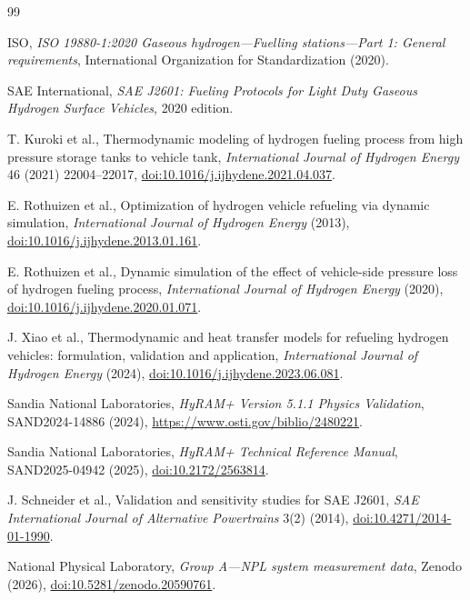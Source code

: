 \documentclass[12pt,a4paper]{article}
\begin{document}
\begin{thebibliography}{99}

ISO, \textit{ISO 19880-1:2020 Gaseous hydrogen---Fuelling stations---Part 1:
General requirements}, International Organization for Standardization (2020).

SAE International, \textit{SAE J2601: Fueling Protocols for Light Duty Gaseous
Hydrogen Surface Vehicles}, 2020 edition.

T. Kuroki et al., Thermodynamic modeling of hydrogen fueling process from high
pressure storage tanks to vehicle tank, \textit{International Journal of Hydrogen
Energy} 46 (2021) 22004--22017,
\href{https://doi.org/10.1016/j.ijhydene.2021.04.037}{doi:10.1016/j.ijhydene.2021.04.037}.

E. Rothuizen et al., Optimization of hydrogen vehicle refueling via dynamic
simulation, \textit{International Journal of Hydrogen Energy} (2013),
\href{https://doi.org/10.1016/j.ijhydene.2013.01.161}{doi:10.1016/j.ijhydene.2013.01.161}.

E. Rothuizen et al., Dynamic simulation of the effect of vehicle-side pressure
loss of hydrogen fueling process, \textit{International Journal of Hydrogen Energy}
(2020), \href{https://doi.org/10.1016/j.ijhydene.2020.01.071}{doi:10.1016/j.ijhydene.2020.01.071}.

J. Xiao et al., Thermodynamic and heat transfer models for refueling hydrogen
vehicles: formulation, validation and application, \textit{International Journal
of Hydrogen Energy} (2024),
\href{https://doi.org/10.1016/j.ijhydene.2023.06.081}{doi:10.1016/j.ijhydene.2023.06.081}.

Sandia National Laboratories, \textit{HyRAM+ Version 5.1.1 Physics Validation},
SAND2024-14886 (2024), \url{https://www.osti.gov/biblio/2480221}.

Sandia National Laboratories, \textit{HyRAM+ Technical Reference Manual},
SAND2025-04942 (2025),
\href{https://doi.org/10.2172/2563814}{doi:10.2172/2563814}.

J. Schneider et al., Validation and sensitivity studies for SAE J2601,
\textit{SAE International Journal of Alternative Powertrains} 3(2) (2014),
\href{https://doi.org/10.4271/2014-01-1990}{doi:10.4271/2014-01-1990}.

National Physical Laboratory, \textit{Group A---NPL system measurement data},
Zenodo (2026),
\href{https://doi.org/10.5281/zenodo.20590761}{doi:10.5281/zenodo.20590761}.


\end{thebibliography}
\end{document}
